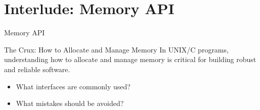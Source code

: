 \section{Interlude: Memory API}

\begin{frame}{Memory API}
    \begin{block}{The Crux: How to Allocate and Manage Memory}
        In UNIX/C programs, understanding how to allocate and manage
        memory is critical for building robust and reliable software.
    \end{block}

    \begin{itemize}
        \item What interfaces are commonly used?
        \item What mistakes should be avoided?
    \end{itemize}
\end{frame}


